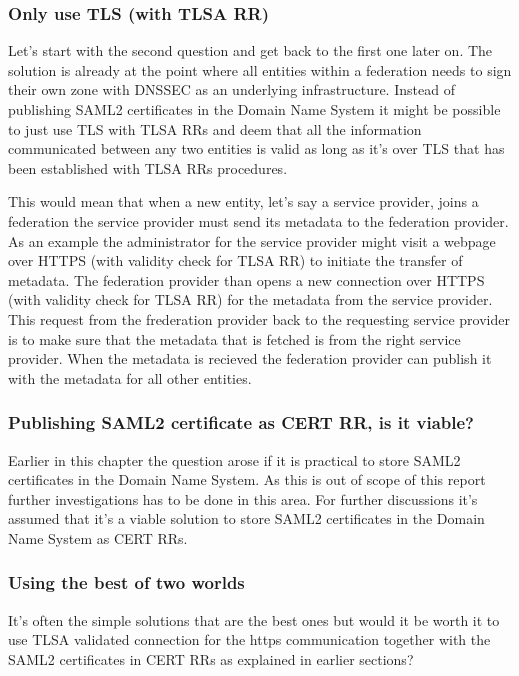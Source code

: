 \subsubsection{Only use TLS (with TLSA RR)}
\label{subsec:only-tlsa-rr-with-tls}
Let's start with the second question and get back to the first one later on.
The solution is already at the point where all entities within a federation needs to sign their own zone with DNSSEC as an underlying infrastructure.
Instead of publishing SAML2 certificates in the Domain Name System it might be possible to just use TLS with TLSA RRs and deem that all the information communicated between any two entities is valid as long as it's over TLS that has been established with TLSA RRs procedures.

This would mean that when a new entity, let's say a service provider, joins a federation the service provider must send its metadata to the federation provider.
As an example the administrator for the service provider might visit a webpage over HTTPS (with validity check for TLSA RR) to initiate the transfer of metadata.
The federation provider than opens a new connection over HTTPS (with validity check for TLSA RR) for the metadata from the service provider.
This request from the frederation provider back to the requesting service provider is to make sure that the metadata that is fetched is from the right service provider. 
When the metadata is recieved the federation provider can publish it with the metadata for all other entities.


\subsubsection{Publishing SAML2 certificate as CERT RR, is it viable?}
\label{subsec:saml2-certs-in-cert-rr}
Earlier in this chapter the question arose if it is practical to store SAML2 certificates in the Domain Name System.
As this is out of scope of this report further investigations has to be done in this area.
For further discussions it's assumed that it's a viable solution to store SAML2 certificates in the Domain Name System as CERT RRs.

\subsubsection{Using the best of two worlds}
It's often the simple solutions that are the best ones but would it be worth it to use TLSA validated connection for the https communication together with the SAML2 certificates in CERT RRs as explained in earlier sections?

